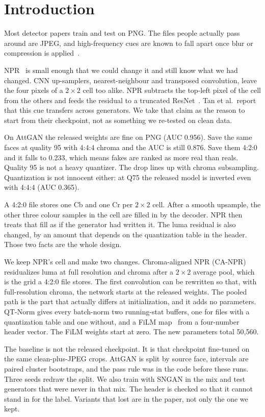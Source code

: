 \documentclass[conference]{IEEEtran}
\begin{document}
\section{Introduction}
Most detector papers train and test on PNG. The files people actually pass around are JPEG, and high-frequency cues are known to fall apart once blur or compression is applied~\cite{wang2020cnndetection,frank2020frequency,le2023qad}.

NPR~\cite{tan2024npr} is small enough that we could change it and still know what we had changed. CNN up-samplers, nearest-neighbour and transposed convolution, leave the four pixels of a $2{\times}2$ cell too alike. NPR subtracts the top-left pixel of the cell from the others and feeds the residual to a truncated ResNet~\cite{he2016resnet}. Tan et al.\ report that this cue transfers across generators. We take that claim as the reason to start from their checkpoint, not as something we re-tested on clean data.

On AttGAN the released weights are fine on PNG (AUC 0.956). Save the same faces at quality 95 with 4:4:4 chroma and the AUC is still 0.876. Save them 4:2:0 and it falls to 0.233, which means fakes are ranked as more real than reals. Quality 95 is not a heavy quantizer. The drop lines up with chroma subsampling. Quantization is not innocent either: at Q75 the released model is inverted even with 4:4:4 (AUC 0.365).

A 4:2:0 file stores one Cb and one Cr per $2{\times}2$ cell. After a smooth upsample, the other three colour samples in the cell are filled in by the decoder. NPR then treats that fill as if the generator had written it. The luma residual is also changed, by an amount that depends on the quantization table in the header. Those two facts are the whole design.

We keep NPR's cell and make two changes. Chroma-aligned NPR (CA-NPR) residualizes luma at full resolution and chroma after a $2{\times}2$ average pool, which is the grid a 4:2:0 file stores. The first convolution can be rewritten so that, with full-resolution chroma, the network starts at the released weights. The pooled path is the part that actually differs at initialization, and it adds no parameters. QT-Norm gives every batch-norm two running-stat buffers, one for files with a quantization table and one without, and a FiLM map~\cite{perez2018film} from a four-number header vector. The FiLM weights start at zero. The new parameters total 50{,}560.

The baseline is not the released checkpoint. It is that checkpoint fine-tuned on the same clean-plus-JPEG crops. AttGAN is split by source face, intervals are paired cluster bootstraps, and the pass rule was in the code before these runs. Three seeds redraw the split. We also train with SNGAN in the mix and test generators that were never in that mix. The header is checked so that it cannot stand in for the label. Variants that lost are in the paper, not only the one we kept.
\end{document}
